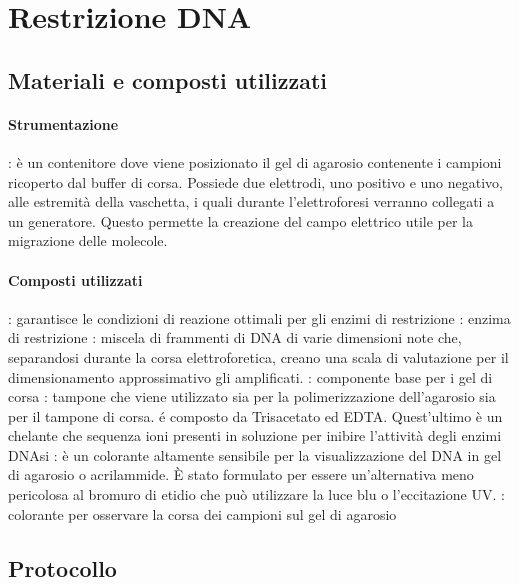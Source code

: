\section{Restrizione DNA}
\subsection{Materiali e composti utilizzati}
\paragraph{Strumentazione}
\begin{itemize}[person]
	: è un contenitore dove viene posizionato il gel di agarosio contenente i campioni ricoperto dal buffer di corsa. Possiede due elettrodi, uno positivo e uno negativo, alle estremità della vaschetta, i quali durante l'elettroforesi verranno collegati a un generatore. Questo permette la creazione del campo elettrico utile per la migrazione delle molecole.
\end{itemize}

\paragraph{Composti utilizzati}
\begin{itemize}[person]
	\itemb[Buffer 10X]: garantisce le condizioni di reazione ottimali per gli enzimi di restrizione
	\itemb[DNA]
	: enzima di restrizione 
	: miscela di frammenti di DNA di varie dimensioni note che, separandosi durante la corsa elettroforetica, creano una scala di valutazione per il dimensionamento approssimativo gli amplificati.
	\itemb[Agarosio]: componente base per i gel di corsa
	\itemb[TAE 50X]: tampone che viene utilizzato sia per la polimerizzazione dell'agarosio sia per il tampone di corsa. é composto da Trisacetato ed EDTA. Quest'ultimo è un chelante che sequenza ioni  presenti in soluzione per inibire l'attività degli enzimi DNAsi
	\itemb[SyberSafe]: è un colorante altamente sensibile per la visualizzazione del DNA in gel di agarosio o acrilammide. È stato formulato per essere un'alternativa meno pericolosa al bromuro di etidio che può utilizzare la luce blu o l'eccitazione UV. 
	: colorante per osservare la corsa dei campioni sul gel di agarosio
\end{itemize}

\subsection{Protocollo}
